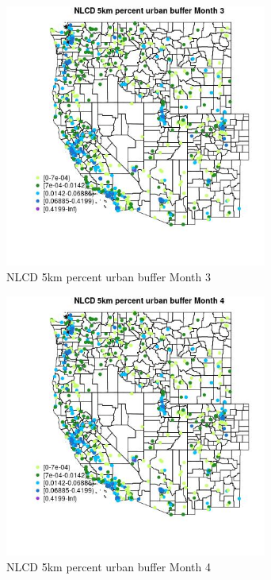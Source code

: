 \begin{figure} 
\centering  
\includegraphics[width=0.77\textwidth]{Code_Outputs/Report_ML_input_PM25_Step4_part_f_de_duplicated_aveswNAs_MapObsMo3NLCD_5km_percent_urban_buffer.jpg} 
\caption{\label{fig:Report_ML_input_PM25_Step4_part_f_de_duplicated_aveswNAsMapObsMo3NLCD_5km_percent_urban_buffer}NLCD 5km percent urban buffer Month 3} 
\end{figure} 
 

\begin{figure} 
\centering  
\includegraphics[width=0.77\textwidth]{Code_Outputs/Report_ML_input_PM25_Step4_part_f_de_duplicated_aveswNAs_MapObsMo4NLCD_5km_percent_urban_buffer.jpg} 
\caption{\label{fig:Report_ML_input_PM25_Step4_part_f_de_duplicated_aveswNAsMapObsMo4NLCD_5km_percent_urban_buffer}NLCD 5km percent urban buffer Month 4} 
\end{figure} 
 


